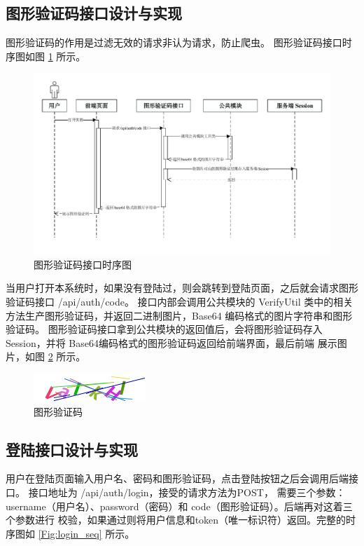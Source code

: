\subsection{图形验证码接口设计与实现}
图形验证码的作用是过滤无效的请求非认为请求，防止爬虫。
图形验证码接口时序图如图 \ref{Fig:code_seq} 所示。

\begin{figure}[ht]
    \centering
    \includegraphics[width=0.9\linewidth]{./Figure/IMG_code_seq.pdf}
    \caption{图形验证码接口时序图}\label{Fig:code_seq}
\end{figure}

当用户打开本系统时，如果没有登陆过，则会跳转到登陆页面，之后就会请求图形验证码接口 /api/auth/code。
接口内部会调用公共模块的 VerifyUtil 类中的相关方法生产图形验证码，并返回二进制图片，Base64 编码格式的图片字符串和图形验证码。
图形验证码接口拿到公共模块的返回值后，会将图形验证码存入Session，并将 Base64编码格式的图形验证码返回给前端界面，最后前端
展示图片，如图 \ref{Fig:code_eg} 所示。

\begin{figure}[ht]
    \centering
    \includegraphics[width=0.5\linewidth]{./Figure/IMG_code.png}
    \caption{图形验证码}\label{Fig:code_eg}
\end{figure}

\subsection{登陆接口设计与实现}
用户在登陆页面输入用户名、密码和图形验证码，点击登陆按钮之后会调用后端接口。
接口地址为 /api/auth/login，接受的请求方法为POST，
需要三个参数：username（用户名）、password（密码）和 code（图形验证码）。后端再对这着三个参数进行
校验，如果通过则将用户信息和token（唯一标识符）返回。完整的时序图如 \ref{Fig:login_seq} 所示。

